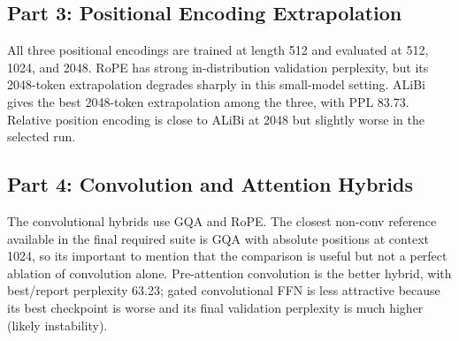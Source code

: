 \documentclass[11pt]{article}
\begin{document}
\subsection{Part 3: Positional Encoding Extrapolation}
All three positional encodings are trained at length 512 and evaluated at 512, 1024, and 2048. RoPE has strong in-distribution validation perplexity, but its 2048-token extrapolation degrades sharply in this small-model setting. ALiBi gives the best 2048-token extrapolation among the three, with PPL 83.73. Relative position encoding is close to ALiBi at 2048 but slightly worse in the selected run.

\begin{table}[H]
\centering
\small
\caption{Positional extrapolation from train length 512.}
\label{tab:positional}
\end{table}

\subsection{Part 4: Convolution and Attention Hybrids}
The convolutional hybrids use GQA and RoPE. The closest non-conv reference available in the final required suite is GQA with absolute positions at context 1024, so its important to mention that the comparison is useful but not a perfect ablation of convolution alone. Pre-attention convolution is the better hybrid, with best/report perplexity 63.23; gated convolutional FFN is less attractive because its best checkpoint is worse and its final validation perplexity is much higher (likely instability).

\begin{table}[H]
\centering
\small
\caption{Convolutional hybrid comparison against closest GQA non-conv reference.}
\label{tab:conv}
\end{table}
\end{document}
